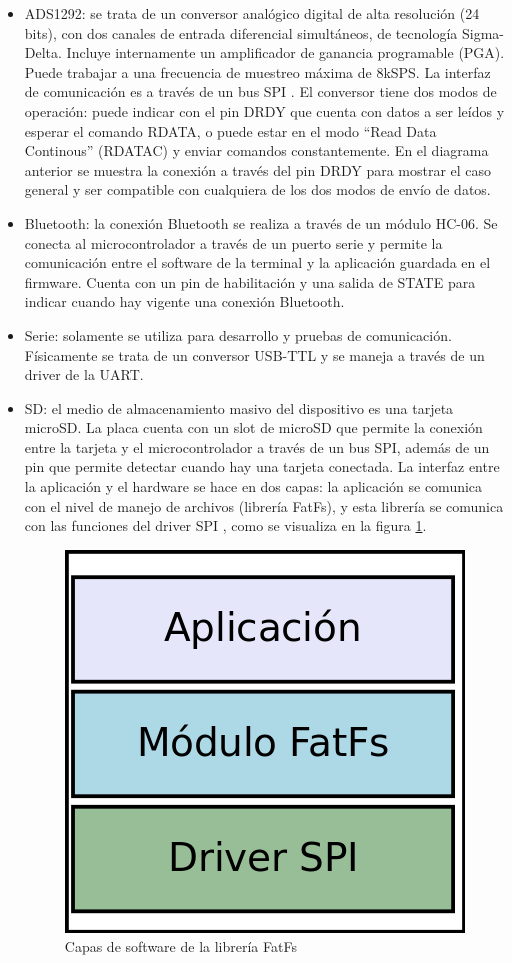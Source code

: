 \begin{itemize}
	\item ADS1292: se trata de un conversor analógico digital de alta resolución (24 bits), con dos canales de entrada diferencial simultáneos, de tecnología Sigma-Delta. Incluye internamente un amplificador de ganancia programable (PGA). Puede trabajar a una frecuencia de muestreo máxima de 8kSPS. La interfaz de comunicación es a través de un bus SPI \citep{texas2012} . El conversor tiene dos modos de operación: puede indicar con el pin DRDY que cuenta con datos a ser leídos y esperar el comando RDATA, o puede estar en el modo “Read Data Continous” (RDATAC) y enviar comandos constantemente. En el diagrama anterior se muestra la conexión a través del pin DRDY para mostrar el caso general y ser compatible con cualquiera de los dos modos de envío de datos.
	\item Bluetooth: la conexión Bluetooth se realiza a través de un módulo HC-06. Se conecta al microcontrolador a través de un puerto serie y permite la comunicación entre el software de la terminal y la aplicación guardada en el firmware. Cuenta con un pin de habilitación y una salida de STATE para indicar cuando hay vigente una conexión Bluetooth.
	\item Serie: solamente se utiliza para desarrollo y pruebas de comunicación. Físicamente se trata de un conversor USB-TTL y se maneja a través de un driver de la UART.
	\item SD: el medio de almacenamiento masivo del dispositivo es una tarjeta microSD. La placa cuenta con un slot de microSD que permite la conexión entre la tarjeta y el microcontrolador a través de un bus SPI, además de un pin que permite detectar cuando hay una tarjeta conectada. La interfaz entre la aplicación y el hardware se hace en dos capas: la aplicación se comunica con el nivel de manejo de archivos (librería FatFs), y esta librería se comunica con las funciones del driver SPI \citep{chan2014}, como se visualiza en la figura \ref{fig:capasFatFs}.
	
\begin{figure}[!htbp]
	\centering
	\includegraphics[scale =0.2]{./Figures/capasFatFs.png}
	\caption{Capas de software de la librería FatFs}
	\label{fig:capasFatFs}
\end{figure}	
	

\end{itemize}
